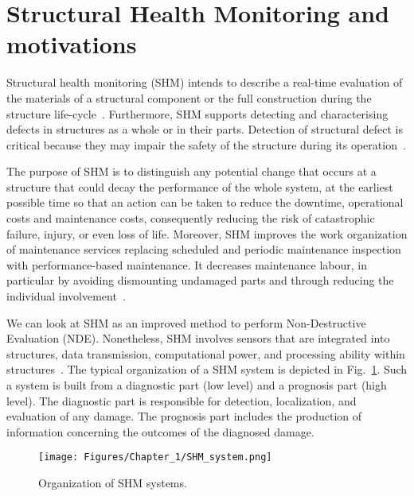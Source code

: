 \section[SHM and motivations]{Structural Health Monitoring and motivations}
\label{sec11}

Structural health monitoring (SHM) intends to describe a real-time evaluation 
of the materials of a structural component or the full construction during the structure life-cycle~\cite{Balageas2010}. 
Furthermore, SHM supports detecting and characterising defects in structures 
as a whole or in their parts.
Detection of structural defect is critical because they may impair the safety of the structure during its operation~\cite{Yuan2016}. 

The purpose of SHM is to distinguish any potential change that occurs at 
a structure that could decay the performance of the whole system, at the 
earliest possible time so that an action can be taken to reduce the downtime, 
operational costs and maintenance costs, consequently reducing the risk of 
catastrophic failure, injury, or even loss of life.
Moreover, SHM improves the work organization of maintenance services replacing scheduled and periodic maintenance inspection with performance-based maintenance.
It decreases maintenance labour, in particular by avoiding dismounting undamaged parts and through reducing the individual involvement~\cite{Balageas2010}.

We can look at SHM as an improved method to perform Non-Destructive Evaluation (NDE). 
Nonetheless, SHM involves sensors that are integrated into structures, data 
transmission, computational power, and processing ability within 
structures~\cite{Balageas2010}. 
The typical organization of a SHM system is depicted in Fig.~\ref{fig:SHMsystem}. 
Such a system is built from a diagnostic part (low level) and a prognosis part (high level).
The diagnostic part is responsible for detection, localization, and evaluation of any damage.
The prognosis part includes the production of information concerning the outcomes of the diagnosed damage.
\begin{figure} [h!]
	\begin{center}
		\texttt{[image: Figures/Chapter\_1/SHM\_system.png]}
	\end{center}
	\caption{Organization of SHM systems.} 
	\label{fig:SHMsystem}
\end{figure}


